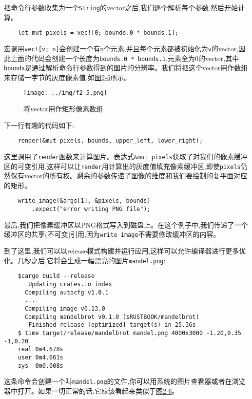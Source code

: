 把命令行参数收集为一个\texttt{String}的vector之后,我们逐个解析每个参数,然后开始计算。

\begin{verbatim}
    let mut pixels = vec![0; bounds.0 * bounds.1];
\end{verbatim}

宏调用\texttt{vec![v; n]}会创建一个有\texttt{n}个元素,并且每个元素都被初始化为\texttt{v}的vector,因此上面的代码会创建一个长度为\texttt{bounds.0 * bounds.1},元素全为0的vector,其中\texttt{bounds}是通过解析命令行参数得到的图片的分辨率。我们将把这个vector用作数组来存储一字节的灰度像素值,如\hyperref[f2-5]{图2-5}所示。

\begin{figure}[htbp]
    \centering
    \texttt{[image: ../img/f2-5.png]}
    \caption{将vector用作矩形像素数组}
    \label{f2-5}
\end{figure}

下一行有趣的代码如下:
\begin{verbatim}
    render(&mut pixels, bounds, upper_left, lower_right);
\end{verbatim}
这里调用了\texttt{render}函数来计算图片。表达式\texttt{\&mut pixels}获取了对我们的像素缓冲区的可变引用,这样可以让\texttt{render}用计算出的灰度值填充像素缓冲区,即使\texttt{pixels}仍然保有vector的所有权。剩余的参数传递了图像的维度和我们要绘制的复平面对应的矩形。

\begin{verbatim}
    write_image(&args[1], &pixels, bounds)
        .expect("error writing PNG file");
\end{verbatim}

最后,我们把像素缓冲区以PNG格式写入到磁盘上。在这个例子中,我们传递了一个缓冲区的共享(不可变)引用,因为\texttt{write\_image}不需要修改缓冲区的内容。

到了这里,我们可以以release模式构建并运行应用,这样可以允许编译器进行更多优化。几秒之后,它将会生成一幅漂亮的图片\texttt{mandel.png}:
\begin{verbatim}
    $cargo build --release
       Updating crates.io index
      Compiling autocfg v1.0.1
      ...
      Compiling image v0.13.0
      Compiling mandelbrot v0.1.0 ($RUSTBOOK/mandelbrot)
       Finished release [optimized] target(s) in 25.36s
    $ time target/release/mandelbrot mandel.png 4000x3000 -1.20,0.35 -1,0.20
    real 0m4.678s
    user 0m4.661s
    sys  0m0.008s
\end{verbatim}
这条命令会创建一个叫\texttt{mandel.png}的文件,你可以用系统的图片查看器或者在浏览器中打开。如果一切正常的话,它应该看起来类似于\hyperref[f2-6]{图2-6}。

